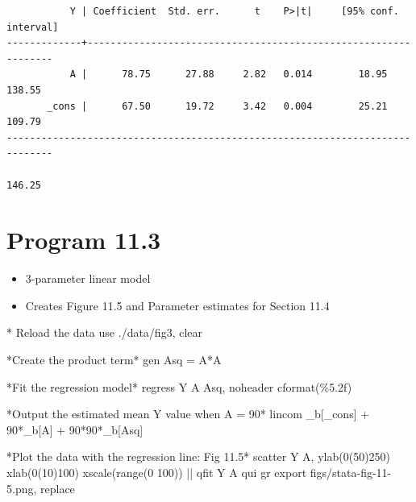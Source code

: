 \documentclass[
  10pt,
  a4paper,
]{book}
\newenvironment{Shaded}{\begin{snugshade}}{\end{snugshade}}
\newcommand{\BaseNTok}[1]{\textcolor[rgb]{0.68,0.00,0.00}{#1}}
\newcommand{\DataTypeTok}[1]{\textcolor[rgb]{0.68,0.00,0.00}{#1}}
\newcommand{\KeywordTok}[1]{\textcolor[rgb]{0.00,0.46,0.62}{#1}}
\newcommand{\NormalTok}[1]{\textcolor[rgb]{0.00,0.46,0.62}{#1}}
\newcommand{\OtherTok}[1]{\textcolor[rgb]{0.00,0.46,0.62}{#1}}
\providecommand{\tightlist}{%
  \setlength{\itemsep}{0pt}\setlength{\parskip}{0pt}}
\begin{document}
\begin{verbatim}
           Y | Coefficient  Std. err.      t    P>|t|     [95% conf. interval]
-------------+----------------------------------------------------------------
           A |      78.75      27.88     2.82   0.014        18.95      138.55
       _cons |      67.50      19.72     3.42   0.004        25.21      109.79
------------------------------------------------------------------------------

146.25
\end{verbatim}

\hypertarget{program-11.3-1}{%
\section{Program 11.3}\label{program-11.3-1}}

\begin{itemize}
\tightlist
\item
  3-parameter linear model
\item
  Creates Figure 11.5 and Parameter estimates for Section 11.4
\end{itemize}

\begin{Shaded}
\begin{Highlighting}[]
\NormalTok{* Reload the }\KeywordTok{data}
\KeywordTok{use}\NormalTok{ ./}\KeywordTok{data}\NormalTok{/fig3, }\KeywordTok{clear}

\NormalTok{*Create the product term*}
\KeywordTok{gen}\NormalTok{ Asq = A*A}

\NormalTok{*Fit the regression }\KeywordTok{model}\NormalTok{*}
\KeywordTok{regress}\NormalTok{ Y A Asq, }\KeywordTok{noheader}\NormalTok{ cformat(\%5.2f)}

\NormalTok{*Output the estimated }\KeywordTok{mean}\NormalTok{ Y }\OtherTok{value}\NormalTok{ when A = 90*}
\KeywordTok{lincom}\NormalTok{ \_b[}\DataTypeTok{\_cons}\NormalTok{] + 90*\_b[A] + 90*90*\_b[Asq]}

\NormalTok{*Plot the }\KeywordTok{data}\NormalTok{ with the regression }\KeywordTok{line}\NormalTok{: Fig 11.5*}
\KeywordTok{scatter}\NormalTok{ Y A, ylab(0(50)250) xlab(0(10)100) }\BaseNTok{xscale}\NormalTok{(}\KeywordTok{range}\NormalTok{(0 100)) || qfit Y A}
\KeywordTok{qui} \KeywordTok{gr} \KeywordTok{export}\NormalTok{ figs/stata{-}fig{-}11{-}5.png, }\KeywordTok{replace}
\end{Highlighting}
\end{Shaded}
\end{document}
